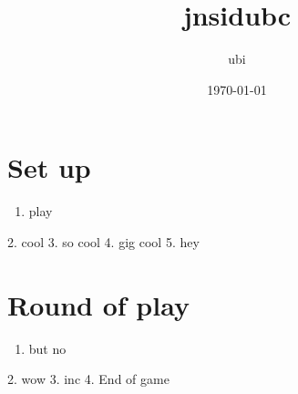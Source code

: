 \documentclass{article}%
\title{jnsidubc}%
\author{ubi}%
\date{\today}%
\begin{document}
%
\pagestyle{empty}%
\normalsize%
\maketitle%
\section{ Set up
}%
\label{sec:Setup}%
\begin{enumerate}%
\item%
 play
%
\end{enumerate}%
2. cool
%
3. so cool
%
4. gig cool
%
5. hey


%
\section{ Round of play
}%
\label{sec:Roundofplay}%
\begin{enumerate}%
\item%
 but no
%
\end{enumerate}%
2. wow
%
3. inc
%
4. End of game

%
\end{document}
